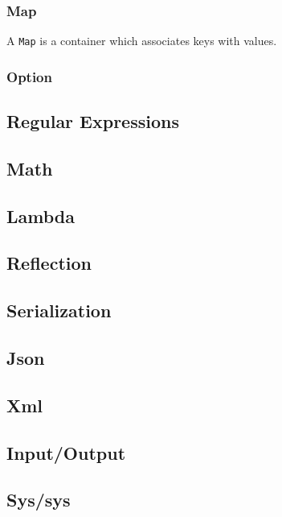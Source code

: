 \documentclass{article}
\newcommand{\type}[1]{\texttt{#1}}
\begin{document}
\subsubsection{Map}
\label{Map}

A \type{Map} is a container which associates keys with values. 

\subsubsection{Option}

\subsection{Regular Expressions}

\subsection{Math}

\subsection{Lambda}
\label{Lambda}

\subsection{Reflection}
\label{Reflection}

\subsection{Serialization}

\subsection{Json}

\subsection{Xml}

\subsection{Input/Output}

\subsection{Sys/sys}
\end{document}
